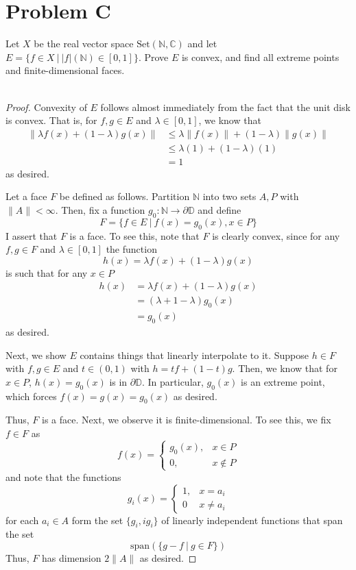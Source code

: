 \documentclass[fontsize=11pt]{scrartcl} %
\numberwithin{equation}{section} %
\numberwithin{figure}{section} %
\numberwithin{table}{section} %
\newcommand{\N}{\mathbb{N}}
\newcommand{\C}{\mathbb{C}}
\begin{document}
\section*{Problem C}
Let $X$ be the real vector space $\text{Set}(\N,\C)$ and let $E=\{f\in X\ |\
|f|(\N)\in[0,1]\}$. Prove $E$ is convex, and find all extreme points and
finite-dimensional faces.
\\
\\
\begin{proof}
    Convexity of $E$ follows almost immediately from the fact that the unit disk
    is convex. That is, for $f,g\in E$ and $\lambda\in [0,1]$, we know that
    \[
\begin{aligned}
        \|\lambda f(x) + (1-\lambda)g(x)\|
        &\leq \lambda \|f(x)\| + (1-\lambda)\|g(x)\|\\
        &\leq \lambda(1) + (1-\lambda)(1)\\
        &=1
\end{aligned}
    \]
    as desired.

    Let a face $F$ be defined as follows. Partition $\N$ into two sets $A,P$
    with $\|A\|<\infty$. Then, fix a function $g_0:\N\to \partial\mathbb{D}$ and
    define
    \[
        F = \{f\in E\ |\ f(x)=g_0(x), x\in P\}
    \]
    I assert that $F$ is a face. To see this, note that $F$ is clearly convex,
    since for any $f,g\in F$ and $\lambda\in[0,1]$ the function
    \[
        h(x) = \lambda f(x) + (1-\lambda)g(x)
    \]
    is such that for any $x\in P$
    \[
        \begin{aligned}
        h(x) &= \lambda f(x) + (1-\lambda)g(x)\\
        &= (\lambda + 1-\lambda)g_0(x)\\
        &=g_0(x)
    \end{aligned}
    \]
    as desired.

    Next, we show $E$ contains things that linearly interpolate to it. Suppose
    $h\in F$ with $f,g\in E$ and $t\in (0,1)$ with $h=tf+(1-t)g$. Then, we know
    that for $x\in P$, $h(x)=g_0(x)$ is in $\partial\mathbb{D}$. In particular,
    $g_0(x)$ is an extreme point, which forces $f(x)=g(x)=g_0(x)$ as desired.

    Thus, $F$ is a face. Next, we observe it is finite-dimensional. To see this,
    we fix $f\in F$ as
    \[
        f(x) = 
        \begin{cases}
            g_0(x), &x\in P\\
            0, &x\not\in P
        \end{cases}
    \]
    and note that the functions
    \[
        g_i(x) =
        \begin{cases}
            1, &x=a_i\\
            0 &x\neq a_i
        \end{cases}
    \]
    for each $a_i\in A$ form the set $\{g_i, ig_i\}$ of linearly independent
    functions that span the set
    \[
        \text{span}(\{g-f\ |\ g\in F\})
    \]
    Thus, $F$ has dimension $2\|A\|$ as desired.


\end{proof}
\end{document}
